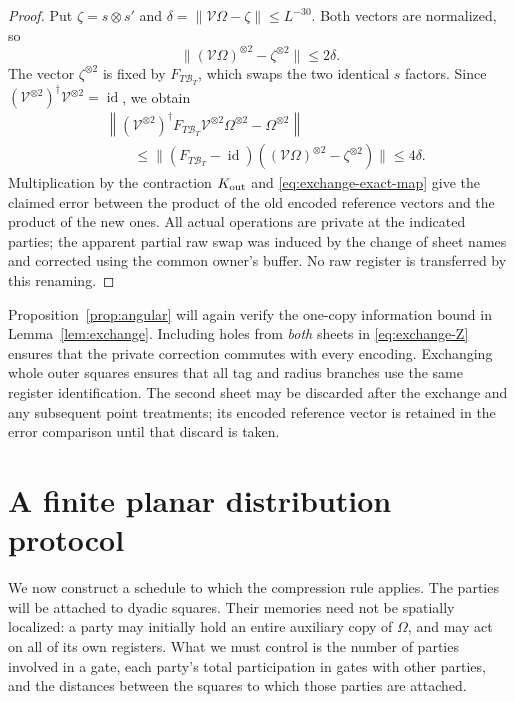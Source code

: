 \documentclass[11pt]{article}
\numberwithin{equation}{section}
\theoremstyle{definition}
\theoremstyle{remark}
\begin{document}
\begin{proof}
Put $\zeta=s\otimes s'$ and
$\delta=\lVert \mathcal V\Omega-\zeta\rVert\le L^{-30}$.  Both vectors are
normalized, so
\[
 \lVert (\mathcal V\Omega)^{\otimes2}-\zeta^{\otimes2}\rVert
      \le2\delta.
\]
The vector $\zeta^{\otimes2}$ is fixed by $F_{T\mathcal B_T}$, which swaps
the two identical $s$ factors.  Since
$(\mathcal V^{\otimes2})^{\dagger}\mathcal V^{\otimes2}=\operatorname{id}$, we obtain
\begin{align*}
 &\left\|
   (\mathcal V^{\otimes2})^{\dagger}F_{T\mathcal B_T}
        \mathcal V^{\otimes2}\Omega^{\otimes2}-\Omega^{\otimes2}
   \right\|\\
 &\hspace{2em}\le
   \lVert (F_{T\mathcal B_T}-\operatorname{id})
                    ((\mathcal V\Omega)^{\otimes2}-\zeta^{\otimes2})\rVert
       \le4\delta.
\end{align*}
Multiplication by the contraction $K_{\rm out}$ and
\eqref{eq:exchange-exact-map} give the claimed error between the product
of the old encoded reference vectors and the product of the new ones.
All actual operations are private at the indicated parties; the apparent
partial raw swap was induced by the change of sheet names and corrected
using the common owner's buffer.  No raw register is transferred by this
renaming.
\end{proof}

Proposition~\ref{prop:angular} will again verify the one-copy information
bound in Lemma~\ref{lem:exchange}.  Including holes from \emph{both} sheets
in \eqref{eq:exchange-Z} ensures that the private correction commutes with
every encoding.  Exchanging whole outer squares ensures that all tag and
radius branches use the same register identification.  The second sheet
may be discarded after the exchange and any subsequent point treatments;
its encoded reference vector is retained in the error comparison until
that discard is taken.

\section{A finite planar distribution protocol}
\label{sec:geometry}

We now construct a schedule to which the compression rule applies.
The parties will be attached to dyadic squares.  Their memories need not
be spatially localized: a party may initially hold an entire auxiliary
copy of $\Omega$, and may act on all of its own registers.  What we must
control is the number of parties involved in a gate, each party's total
participation in gates with other parties, and the distances between the
squares to which those parties are attached.
\end{document}
